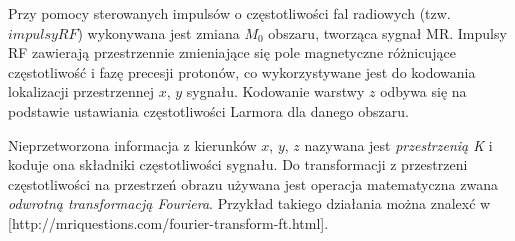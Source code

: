 Przy pomocy sterowanych impulsów o częstotliwości fal radiowych (tzw. $impulsy RF$) wykonywana jest zmiana $M_0$ obszaru, tworząca sygnał MR. Impulsy RF zawierają przestrzennie zmieniające się pole magnetyczne różnicujące częstotliwość i fazę precesji protonów, co wykorzystywane jest do kodowania lokalizacji przestrzennej $x$, $y$ sygnału. Kodowanie warstwy $z$ odbywa się na podstawie ustawiania częstotliwości Larmora dla danego obszaru.

Nieprzetworzona informacja z kierunków $x$, $y$, $z$ nazywana jest \textit{przestrzenią K} i koduje ona składniki częstotliwości sygnału. Do transformacji z przestrzeni częstotliwości na przestrzeń obrazu używana jest operacja matematyczna zwana \textit{odwrotną transformacją Fouriera}. Przykład takiego działania można znalexć w [http://mriquestions.com/fourier-transform-ft.html].


